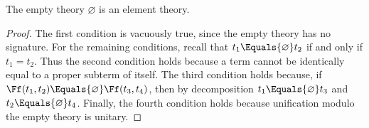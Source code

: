 \begin{Lemma}
    The empty theory $\varnothing$ is an element theory.
\end{Lemma}
\begin{proof}
    The first condition is vacuously true, since the empty theory has no
    signature. For the remaining conditions, recall that $t_1
    \Equals{\varnothing} t_2$ if and only if $t_1 = t_2$. Thus the second
    condition holds because a term cannot be identically equal to a proper
    subterm of itself. The third condition holds because, if $\Ff(t_1, t_2)
    \Equals{\varnothing} \Ff(t_3, t_4)$, then by decomposition $t_1
    \Equals{\varnothing} t_3$ and $t_2 \Equals{\varnothing} t_4$. Finally, the
    fourth condition holds because unification modulo the empty theory is
    unitary.
\end{proof}

